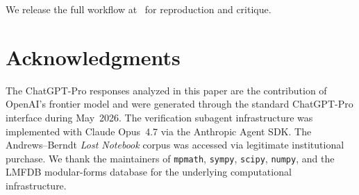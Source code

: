 \documentclass[11pt,reqno]{amsart}
\theoremstyle{definition}
\begin{document}
We release the full workflow at~\cite{ProjectC} for reproduction and
critique.

\section*{Acknowledgments}

The ChatGPT-Pro responses analyzed in this paper are the
contribution of OpenAI's frontier model and were generated through
the standard ChatGPT-Pro interface during May~2026. The verification
subagent infrastructure was implemented with Claude Opus~4.7 via the
Anthropic Agent SDK. The Andrews--Berndt \emph{Lost Notebook} corpus
was accessed via legitimate institutional purchase. We thank the
maintainers of \texttt{mpmath}, \texttt{sympy}, \texttt{scipy},
\texttt{numpy}, and the LMFDB modular-forms database for the
underlying computational infrastructure.



\end{document}

